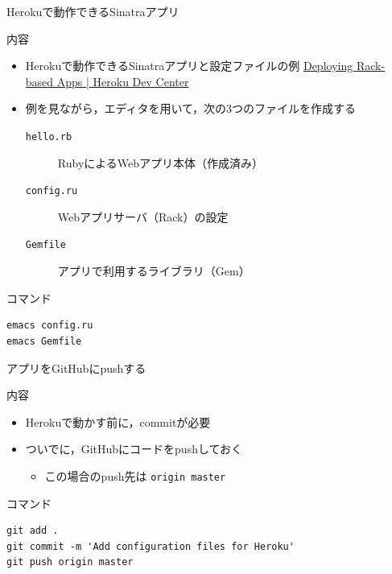 \documentclass[t, aspectratio=169]{beamer}
\begin{document}
\begin{frame}[fragile,label=sec-5-2-3]{Herokuで動作できるSinatraアプリ}
 \begin{block}{内容}
\begin{itemize}
\item Herokuで動作できるSinatraアプリと設定ファイルの例
\href{https://devcenter.heroku.com/articles/rack#sinatra}{Deploying Rack-based Apps | Heroku Dev Center}
\item 例を見ながら，エディタを用いて，次の3つのファイルを作成する
\begin{description}
\item[{\texttt{hello.rb}}] RubyによるWebアプリ本体（作成済み）
\item[{\texttt{config.ru}}] Webアプリサーバ（Rack）の設定
\item[{\texttt{Gemfile}}] アプリで利用するライブラリ（Gem）
\end{description}
\end{itemize}
\end{block}

\begin{block}{コマンド}
\begin{verbatim}
emacs config.ru
emacs Gemfile
\end{verbatim}
\end{block}
\end{frame}
\begin{frame}[fragile,label=sec-5-2-4]{アプリをGitHubにpushする}
 \begin{block}{内容}
\begin{itemize}
\item Herokuで動かす前に，commitが必要
\item ついでに，GitHubにコードをpushしておく
\begin{itemize}
\item この場合のpush先は \texttt{origin master}
\end{itemize}
\end{itemize}
\end{block}

\begin{block}{コマンド}
\begin{verbatim}
git add .
git commit -m 'Add configuration files for Heroku'
git push origin master
\end{verbatim}
\end{block}
\end{frame}
\end{document}
